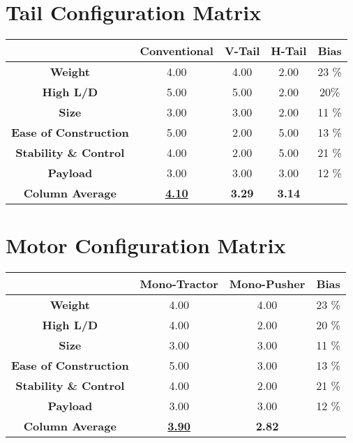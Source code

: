\documentclass[titlepage]{article}
\begin{document}
\begin{appendices}
\newpage 

\section{Tail Configuration Matrix}
\label{sec:tail}
\begin{table}[h!]
\centering
\begin{tabular}{|c|c|c|c|c|}
\hline
& \textbf{Conventional} & \textbf{V-Tail} & \textbf{H-Tail} & \textbf{Bias}\\
\hline
\textbf{Weight} & 4.00 & 4.00 & 2.00 & 23 \%\\
\hline
\textbf{High L/D} & 5.00 & 5.00 & 2.00 & 20\%\\
\hline
\textbf{Size} & 3.00 & 3.00 & 2.00 & 11 \% \\
\hline
\textbf{Ease of Construction} & 5.00 & 2.00 & 5.00 & 13 \% \\
\hline
\textbf{Stability \& Control} & 4.00 & 2.00 & 5.00 & 21 \% \\
\hline
\textbf{Payload} & 3.00 & 3.00 & 3.00 & 12 \% \\
\hline
\textbf{Column Average} & \textbf{\underline{4.10}} & \textbf{3.29} & \textbf{3.14} & \\
\hline
\end{tabular}
\label{tab:tail}
\end{table}

\section{Motor Configuration Matrix}
\label{sec:motor}
\begin{table}[h!]
\centering
\begin{tabular}{|c|c|c|c|}
\hline
& \textbf{Mono-Tractor} & \textbf{Mono-Pusher} & \textbf{Bias}\\
\hline
\textbf{Weight} & 4.00 & 4.00 & 23 \%\\
\hline
\textbf{High L/D} & 4.00 & 2.00 & 20 \%\\
\hline
\textbf{Size} & 3.00 & 3.00 & 11 \% \\
\hline
\textbf{Ease of Construction} & 5.00 & 3.00 & 13 \% \\
\hline
\textbf{Stability \& Control} & 4.00 & 2.00 & 21 \% \\
\hline
\textbf{Payload} & 3.00 & 3.00 & 12 \% \\
\hline
\textbf{Column Average} & \textbf{\underline{3.90}} & \textbf{2.82}& \\
\hline
\end{tabular}
\label{tab:motor}
\end{table}
\end{appendices}
\end{document}
